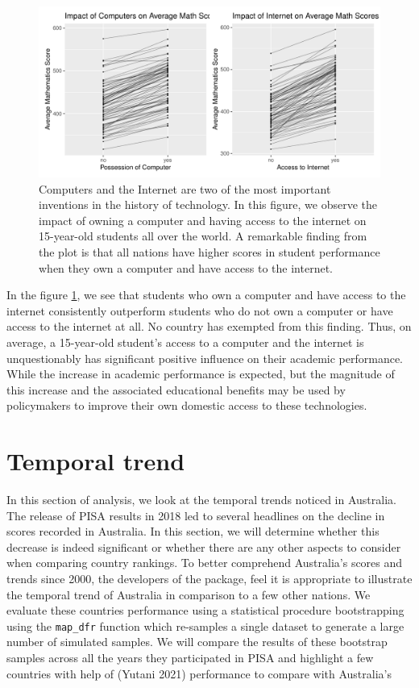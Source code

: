 \begin{figure}[H]
\includegraphics[width=1\linewidth]{learningtower_files/figure-latex/compint-plot-1} \caption{Computers and the Internet are two of the most important inventions in the history of technology. In this figure, we observe the impact of owning a computer and having access to the internet on 15-year-old students all over the world. A remarkable finding from the plot is that all nations have higher scores in student performance when they own a computer and have access to the internet.}\label{fig:compint-plot}
\end{figure}

In the figure \ref{fig:compint-plot}, we see that students who own a computer and have access to the internet consistently outperform students who do not own a computer or have access to the internet at all. No country has exempted from this finding. Thus, on average, a 15-year-old student's access to a computer and the internet is unquestionably has significant positive influence on their academic performance. While the increase in academic performance is expected, but the magnitude of this increase and the associated educational benefits may be used by policymakers to improve their own domestic access to these technologies.

\hypertarget{temporal-trend}{%
\section{Temporal trend}\label{temporal-trend}}

In this section of analysis, we look at the temporal trends noticed in Australia. The release of PISA results in 2018 led to several headlines on the decline in scores recorded in Australia. In this section, we will determine whether this decrease is indeed significant or whether there are any other aspects to consider when comparing country rankings. To better comprehend Australia's scores and trends since 2000, the developers of the  package, feel it is appropriate to illustrate the temporal trend of Australia in comparison to a few other nations. We evaluate these countries performance using a statistical procedure bootstrapping using the \texttt{map\_dfr} function which re-samples a single dataset to generate a large number of simulated samples. We will compare the results of these bootstrap samples across all the years they participated in PISA and highlight a few countries with help of  (Yutani 2021) performance to compare with Australia's

